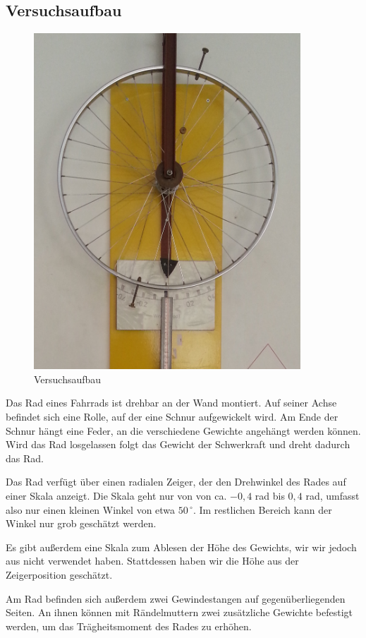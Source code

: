\documentclass[a4paper,german,12pt,smallheadings]{scrartcl}
\begin{document}
\subsection{Versuchsaufbau}
\begin{figure}
  \includegraphics[width=10cm]{fig1.jpg}
  \caption{Versuchsaufbau}
\end{figure}
Das Rad eines Fahrrads ist drehbar an der Wand montiert. Auf seiner Achse
befindet sich eine Rolle, auf der eine Schnur aufgewickelt wird. Am Ende
der Schnur hängt eine Feder, an die verschiedene Gewichte angehängt werden
können. Wird das Rad losgelassen folgt das Gewicht der Schwerkraft und dreht
dadurch das Rad.

Das Rad verfügt über einen radialen Zeiger, der den Drehwinkel des Rades auf
einer Skala anzeigt. Die Skala geht nur von von ca. $-0{,}4$ rad bis $0{,}4$
rad, umfasst also nur einen kleinen Winkel von etwa $50\,^\circ$.  Im
restlichen Bereich kann der Winkel nur grob geschätzt werden.

Es gibt außerdem eine Skala zum Ablesen der Höhe des Gewichts, wir wir jedoch
aus nicht verwendet haben. Stattdessen haben wir die Höhe aus der
Zeigerposition geschätzt.

Am Rad befinden sich außerdem zwei Gewindestangen auf gegenüberliegenden
Seiten. An ihnen können mit Rändelmuttern zwei zusätzliche Gewichte befestigt
werden, um das Trägheitsmoment des Rades zu erhöhen.
\end{document}
